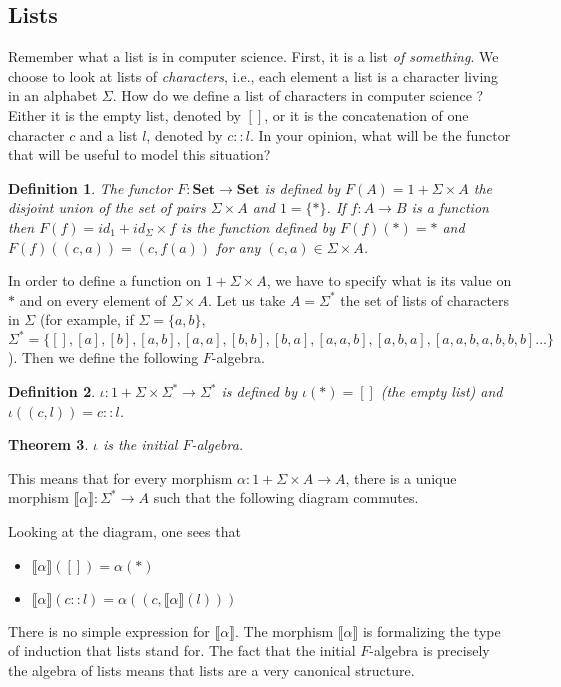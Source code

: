 \documentclass[11pt,a4paper]{article}
\newtheorem{theo}{Theorem}
\newtheorem{defi}[theo]{Definition}
\newcommand{\itemz}{\item[$\triangleright$]}
\newcommand{\gr}{\textbf}
\newcommand{\il}{\textit}
\newcommand{\lb}{\llbracket}
\newcommand{\rb}{\rrbracket}
\newcommand{\1}{\mathbbm{1}}
\begin{document}
\subsection*{Lists}
Remember what a list is in computer science. First, it is a list \il{of something}. We choose to look at lists of \il{characters}, i.e., each element a list is a character living in an alphabet $\Sigma$. How do we define a list of characters in computer science ? Either it is the empty list, denoted by $[]$, or it is the concatenation of one character $c$ and a list $l$, denoted by $c::l$. In your opinion, what will be the functor that will be useful to model this situation?
\begin{defi}
The functor $F : \gr{Set} \to \gr{Set}$ is defined by $F(A) = 1 + \Sigma \times A$ the disjoint union of the set of pairs $\Sigma \times A$ and $1 = \{*\}$. If $f : A \to B$ is a function then $F(f) = id_1 + id_\Sigma \times f$ is the function defined by $F(f)(*) = *$ and $F(f)((c,a)) = (c,f(a))$ for any $(c,a) \in \Sigma \times A$.
\end{defi}
In order to define a function on $1 + \Sigma \times A$, we have to specify what is its value on $*$ and on every element of $\Sigma \times A$. Let us take $A = \Sigma^*$ the set of lists of characters in $\Sigma$ (for example, if $\Sigma = \{a,b\}$, $\Sigma^* = \{[], [a], [b], [a,b], [a,a], [b,b], [b,a], [a,a,b], [a,b,a], [a,a,b,a,b,b,b]...\}$). Then we define the following $F$-algebra.
\begin{defi} $\iota : 1 + \Sigma \times \Sigma^* \to \Sigma^*$ is defined by $\iota(*) = []$ (the empty list) and $\iota((c,l)) = c::l$.\end{defi}
\begin{theo} $\iota$ is the initial $F$-algebra. \end{theo} 
This means that for every morphism $\alpha : 1 + \Sigma \times A \to A$, there is a unique morphism $\lb \alpha \rb : \Sigma^* \to A$ such that the following diagram commutes.
\begin{center}
\end{center} 
Looking at the diagram, one sees that
\begin{itemize}
\setlength\itemsep{-0.3em}
\itemz $\lb \alpha \rb ([]) = \alpha(*)$
\itemz $\lb \alpha \rb (c::l) = \alpha((c,\lb \alpha \rb(l)))$
\end{itemize}
There is no simple expression for $\lb \alpha \rb$. The morphism $\lb \alpha \rb$ is formalizing the type of induction that lists stand for. The fact that the initial $F$-algebra is precisely the algebra of lists means that lists are a very canonical structure. 
\newpage
\end{document}
